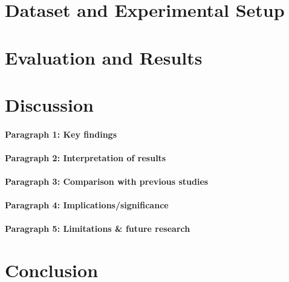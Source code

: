 \documentclass[11pt]{article}
\begin{document}

\section{Dataset and Experimental Setup}


\section{Evaluation and Results}


\section{Discussion}


\paragraph{Paragraph 1: Key findings}

\paragraph{Paragraph 2: Interpretation of results}

\paragraph{Paragraph 3: Comparison with previous studies}

\paragraph{Paragraph 4: Implications/significance}

\paragraph{Paragraph 5: Limitations \& future research}

\cite{janssens2025comparative}

\section{Conclusion}






\end{document}
